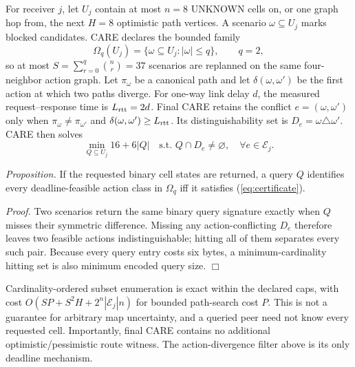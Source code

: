 \documentclass[conference]{IEEEtran}
\begin{document}
For receiver $j$, let $U_j$ contain at most $n=8$ UNKNOWN cells on, or one
graph hop from, the next $H=8$ optimistic path vertices. A scenario
$\omega\subseteq U_j$ marks blocked candidates. CARE declares the bounded
family
\begin{equation}
 \Omega_q(U_j)=\{\omega\subseteq U_j:|\omega|\le q\},\qquad q=2,
\end{equation}
so at most $S=\sum_{r=0}^{q}\binom{n}{r}=37$ scenarios are replanned on the
same four-neighbor action graph. Let $\pi_\omega$ be a canonical path and let
$\delta(\omega,\omega')$ be the first action at which two paths diverge. For
one-way link delay $d$, the measured request--response time is
$L_{\rm rtt}=2d$. Final CARE retains the conflict
$e=(\omega,\omega')$ only when $\pi_\omega\ne\pi_{\omega'}$ and
$\delta(\omega,\omega')\ge L_{\rm rtt}$. Its distinguishability set is
$D_e=\omega\triangle\omega'$. CARE then solves
\begin{equation}
 \min_{Q\subseteq U_j}16+6|Q|\quad
 \text{s.t. }Q\cap D_e\neq\varnothing,\quad\forall e\in\mathcal E_j .
 \label{eq:certificate}
\end{equation}

\textit{Proposition.} If the requested binary cell states are returned, a
query $Q$ identifies every deadline-feasible action class in $\Omega_q$ iff it
satisfies (\ref{eq:certificate}).

\textit{Proof.} Two scenarios return the same binary query signature exactly
when $Q$ misses their symmetric difference. Missing any action-conflicting
$D_e$ therefore leaves two feasible actions indistinguishable; hitting all of
them separates every such pair. Because every query entry costs six bytes, a
minimum-cardinality hitting set is also minimum encoded query size. \hfill$\Box$

Cardinality-ordered subset enumeration is exact within the declared caps, with
cost $O(SP+S^2H+2^n|\mathcal E_j|n)$ for bounded path-search cost $P$. This is
not a guarantee for arbitrary map uncertainty, and a queried peer need not
know every requested cell. Importantly, final CARE contains no additional
optimistic/pessimistic route witness. The action-divergence filter above is its
only deadline mechanism.
\end{document}
